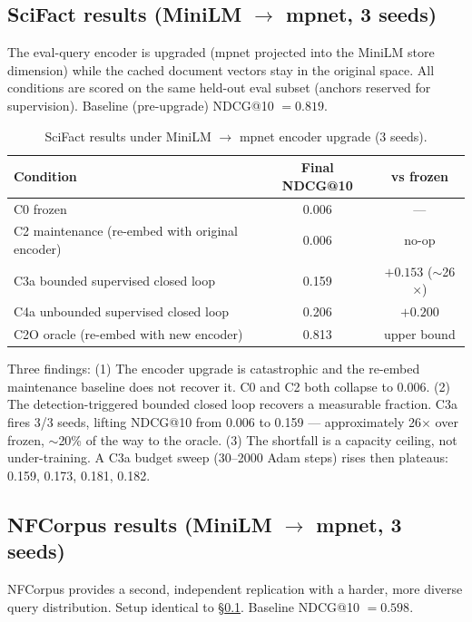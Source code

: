 \documentclass[12pt]{article}
\begin{document}
\subsection{SciFact results (MiniLM \texorpdfstring{$\to$}{->} mpnet, 3 seeds)}
\label{sec:scifact}

The eval-query encoder is upgraded (mpnet projected into the MiniLM store dimension) while the cached document vectors stay in the original space. All conditions are scored on the same held-out eval subset (anchors reserved for supervision). Baseline (pre-upgrade) NDCG@10 $= 0.819$.

\begin{table}[ht]
\centering
\caption{SciFact results under MiniLM $\to$ mpnet encoder upgrade (3 seeds).}
\label{tab:scifact}
\begin{tabular}{lcc}
\toprule
\textbf{Condition} & \textbf{Final NDCG@10} & \textbf{vs frozen} \\
\midrule
C0 frozen & 0.006 & --- \\
C2 maintenance (re-embed with original encoder) & 0.006 & no-op \\
C3a bounded supervised closed loop & 0.159 & $+0.153$ ($\sim$26$\times$) \\
C4a unbounded supervised closed loop & 0.206 & $+0.200$ \\
C2O oracle (re-embed with new encoder) & 0.813 & upper bound \\
\bottomrule
\end{tabular}
\end{table}

Three findings: (1) The encoder upgrade is catastrophic and the re-embed maintenance baseline does not recover it. C0 and C2 both collapse to 0.006. (2) The detection-triggered bounded closed loop recovers a measurable fraction. C3a fires 3/3 seeds, lifting NDCG@10 from 0.006 to 0.159 --- approximately 26$\times$ over frozen, $\sim$20\% of the way to the oracle. (3) The shortfall is a capacity ceiling, not under-training. A C3a budget sweep (30--2000 Adam steps) rises then plateaus: 0.159, 0.173, 0.181, 0.182.

\subsection{NFCorpus results (MiniLM \texorpdfstring{$\to$}{->} mpnet, 3 seeds)}
\label{sec:nfcorpus}

NFCorpus provides a second, independent replication with a harder, more diverse query distribution. Setup identical to \S\ref{sec:scifact}. Baseline NDCG@10 $= 0.598$.
\end{document}
